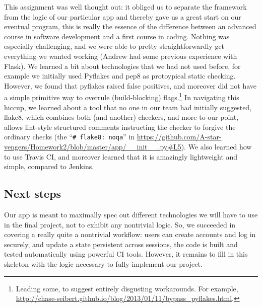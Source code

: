 \documentclass[10pt]{article}
\theoremstyle{remark}
\numberwithin{equation}{section}
\begin{document}
This assignment was well thought out: it obliged us to separate the framework from the logic of our particular app and thereby gave us a great start on our eventual program, this is really the essence of the difference between an advanced course in software development and a first course in coding. Nothing was especially challenging, and we were able to pretty straightforwardly get everything we wanted working (Andrew had some previous experience with Flask). We learned a bit about technologies that we had not used before, for example we initially used Pyflakes and pep8 as protoypical static checking. However, we found that pyflakes raised false positives, and moreover did not have a simple primitive way to overrule (build-blocking) flags.\footnote{Leading some, to suggest entirely disgusting workarounds. For example, \url{http://chase-seibert.github.io/blog/2013/01/11/bypass_pyflakes.html}.} In navigating this hiccup, we learned about a tool that no one in our team had initially suggested, flake8, which combines both (and another) checkers, and more to our point, allows lint-style structured comments instructing the checker to forgive the ordinary checks (the ``\verb|# flake8: noqa|'' in \url{https://github.com/A-star-vengers/Homework2/blob/master/app/__init__.py#L5}). We also learned how to use Travis CI, and moreover learned that it is amazingly lightweight and simple, compared to Jenkins.


\subsection{Next steps} 
Our app is meant to maximally spec out different technologies we will have to use in the final project, not to exhibit any nontrivial logic. So, we succeeded in covering a really quite a nontrivial workflow: users can create accounts and log in securely, and update a state persistent across sessions, the code is built and tested automatically using powerful CI tools. However, it remains to fill in this skeleton with the logic necessary to fully implement our project. 

\begin{spacing}{0.9}
\printbibliography
\end{spacing}
\end{document}

